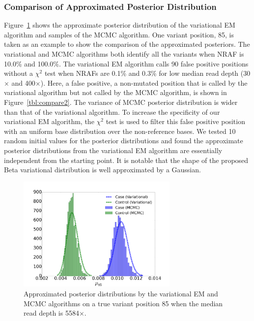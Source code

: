 \documentclass[11pt,reqno]{amsart}
\begin{document}
\subsubsection{Comparison of Approximated Posterior Distribution}
Figure~\ref{tbl:compare1} shows the approximate posterior distribution of the variational EM algorithm and samples of the MCMC algorithm.
One variant position, 85, is taken as an example to show the comparison of the approximated posteriors.
The variational and MCMC algorithms both identify all the variants when NRAF is 10.0\% and 100.0\%.
The variational EM algorithm calls 90 false positive positions without a $\chi^2$ test when NRAFs are 0.1\% and 0.3\% for low median read depth (30$\times$ and 400$\times$).
Here, a false positive, a non-mutated position that is called by the variational algorithm but not called by the MCMC algorithm, is shown in Figure~\ref{tbl:compare2}.
The variance of MCMC posterior distribution is wider than that of the variational algorithm.
To increase the specificity of our variational EM algorithm, the $\chi^2$ test is used to filter this false positive position with an uniform base distribution over the non-reference bases.
We tested 10 random initial values for the posterior distributions and found the approximate posterior distributions from the variational EM algorithm are essentially independent from the starting point.
It is notable that the shape of the proposed Beta variational distribution is well approximated by a Gaussian.
\begin{figure}[htbp]
\centering
\includegraphics[width=0.7\textwidth]{figs/position_85_5584_mcmc_vs_var_mu_fig1.png}
\caption{Approximated posterior distributions by the variational EM and MCMC algorithms on a true variant position 85 when the median read depth is 5584$\times$.}
\label{tbl:compare1}
\end{figure}
\end{document}
